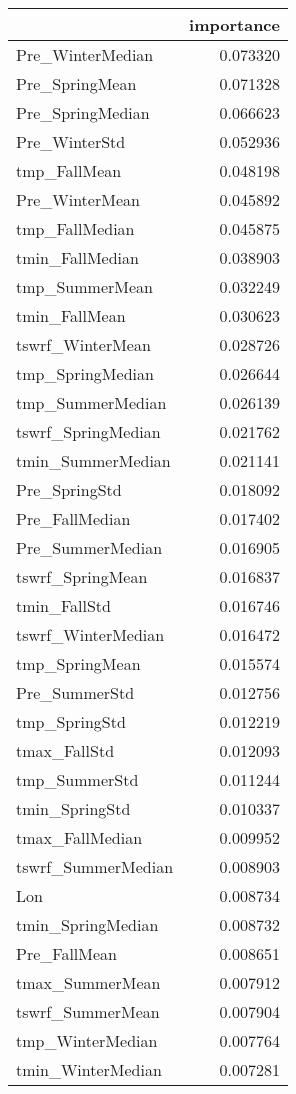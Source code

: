 \begin{tabular}{lr}
\toprule
 & importance \\
\midrule
Pre_WinterMedian & 0.073320 \\
Pre_SpringMean & 0.071328 \\
Pre_SpringMedian & 0.066623 \\
Pre_WinterStd & 0.052936 \\
tmp_FallMean & 0.048198 \\
Pre_WinterMean & 0.045892 \\
tmp_FallMedian & 0.045875 \\
tmin_FallMedian & 0.038903 \\
tmp_SummerMean & 0.032249 \\
tmin_FallMean & 0.030623 \\
tswrf_WinterMean & 0.028726 \\
tmp_SpringMedian & 0.026644 \\
tmp_SummerMedian & 0.026139 \\
tswrf_SpringMedian & 0.021762 \\
tmin_SummerMedian & 0.021141 \\
Pre_SpringStd & 0.018092 \\
Pre_FallMedian & 0.017402 \\
Pre_SummerMedian & 0.016905 \\
tswrf_SpringMean & 0.016837 \\
tmin_FallStd & 0.016746 \\
tswrf_WinterMedian & 0.016472 \\
tmp_SpringMean & 0.015574 \\
Pre_SummerStd & 0.012756 \\
tmp_SpringStd & 0.012219 \\
tmax_FallStd & 0.012093 \\
tmp_SummerStd & 0.011244 \\
tmin_SpringStd & 0.010337 \\
tmax_FallMedian & 0.009952 \\
tswrf_SummerMedian & 0.008903 \\
Lon & 0.008734 \\
tmin_SpringMedian & 0.008732 \\
Pre_FallMean & 0.008651 \\
tmax_SummerMean & 0.007912 \\
tswrf_SummerMean & 0.007904 \\
tmp_WinterMedian & 0.007764 \\
tmin_WinterMedian & 0.007281 \\

\end{tabular}
